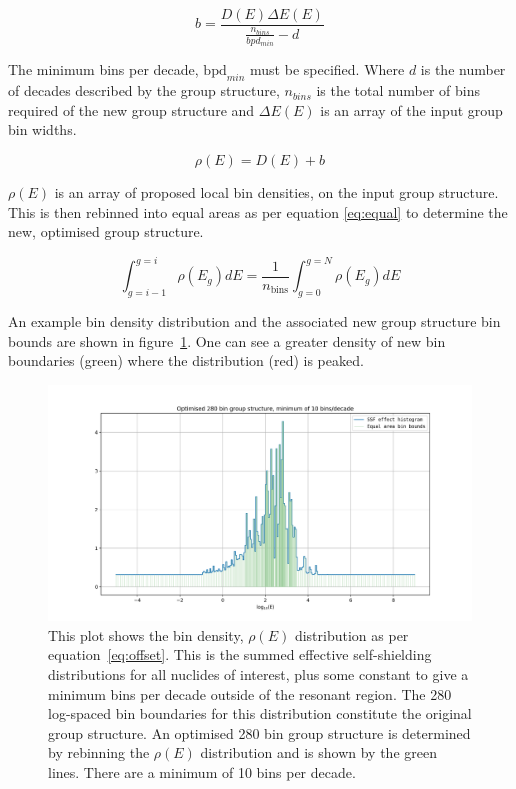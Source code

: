 \begin{equation}
  \label{eq:b}
  b = \frac{D(E) \Delta E(E)}{\frac{n_{bins}}{bpd_{min}} - d}
\end{equation}

The minimum bins per decade, $\mathrm{bpd}_{min}$ must be specified. Where $d$ is the number of decades described by the group structure, $n_{bins}$ is the total number of bins required of the new group structure and $\Delta E(E)$ is an array of the input group bin widths.

\begin{equation}
  \label{eq:offset}
  \rho(E) = D(E) + b
\end{equation}

$\rho(E)$ is an array of proposed local bin densities, on the input group structure. This is then rebinned into equal areas as per equation \ref{eq:equal} to determine the new, optimised group structure.

\begin{equation}
  \label{eq:equal}
  \int_{g=i-1}^{g=i} \rho(E_{g})dE = \frac{1}{n_\mathrm{bins}}\int_{g=0}^{g=N}\rho(E_{g})dE 
\end{equation} 

An example bin density distribution and the associated new group structure bin bounds are shown in figure~\ref{fig:optimised_bounds}. One can see a greater density of new bin boundaries (green) where the distribution (red) is peaked.

\begin{figure}
  \centering
  \includegraphics[width=0.8\linewidth]{nbins-280_bpd-10}
  \caption{This plot shows the bin density, $\rho(E)$ distribution as per equation~\ref{eq:offset}. This is the summed effective self-shielding distributions for all nuclides of interest, plus some constant to give a minimum bins per decade outside of the resonant region. The 280 log-spaced bin boundaries for this distribution constitute the original group structure. An optimised 280 bin group structure is determined by rebinning the $\rho(E)$ distribution and is shown by the green lines. There are a minimum of 10 bins per decade.}
  \label{fig:optimised_bounds}
\end{figure}

